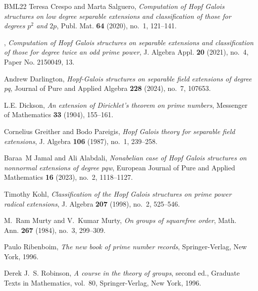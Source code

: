 \documentclass[a4paper,reqno]{amsart}
\theoremstyle{definition}
\begin{document}
\begin{thebibliography}{BML22}
Teresa Crespo and Marta Salguero, \emph{Computation of {H}opf {G}alois
  structures on low degree separable extensions and classification of those for
  degrees {$p^2$} and {$2p$}}, Publ. Mat. \textbf{64} (2020), no.~1, 121--141.

\bysame, \emph{Computation of {H}opf {G}alois structures on separable
  extensions and classification of those for degree twice an odd prime power},
  J. Algebra Appl. \textbf{20} (2021), no.~4, Paper No. 2150049, 13.

Andrew Darlington, \emph{Hopf-{G}alois structures on separable field extensions
  of degree pq}, Journal of Pure and Applied Algebra \textbf{228} (2024),
  no.~7, 107653.

L.E. Dickson, \emph{An extension of {D}irichlet's theorem on prime numbers},
  Messenger of Mathematics \textbf{33} (1904), 155--161.

Cornelius Greither and Bodo Pareigis, \emph{Hopf {G}alois theory for separable
  field extensions}, J. Algebra \textbf{106} (1987), no.~1, 239--258.

Baraa~M Jamal and Ali Alabdali, \emph{Nonabelian case of {H}opf {G}alois
  structures on nonnormal extensions of degree pqw}, European Journal of Pure
  and Applied Mathematics \textbf{16} (2023), no.~2, 1118–1127.

Timothy Kohl, \emph{Classification of the {H}opf {G}alois structures on prime
  power radical extensions}, J. Algebra \textbf{207} (1998), no.~2, 525--546.

M.~Ram Murty and V.~Kumar Murty, \emph{On groups of squarefree order}, Math.
  Ann. \textbf{267} (1984), no.~3, 299--309. 

Paulo Ribenboim, \emph{The new book of prime number records}, Springer-Verlag,
  New York, 1996. 

Derek J.~S. Robinson, \emph{A course in the theory of groups}, second ed.,
  Graduate Texts in Mathematics, vol.~80, Springer-Verlag, New York, 1996.

\end{thebibliography}
\end{document}
